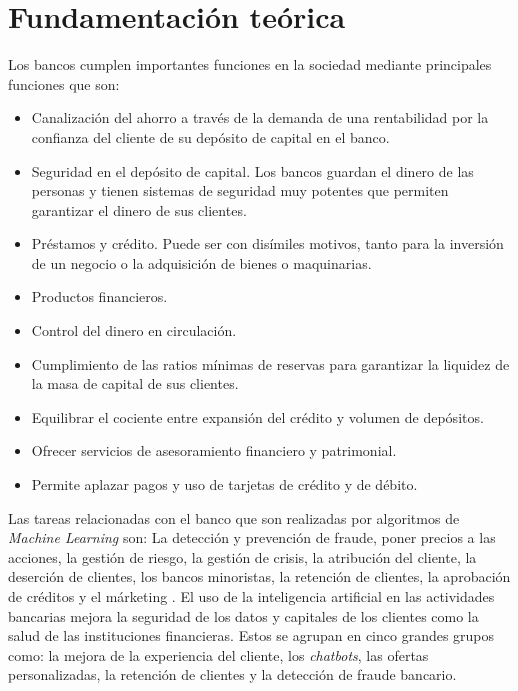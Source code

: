 \chapter{Fundamentaci\'{o}n te\'{o}rica}

  Los bancos cumplen importantes funciones en la sociedad mediante principales funciones que son\cite{1}:
  
  \begin{itemize}
  	\item Canalizaci\'{o}n del ahorro a trav\'{e}s de la demanda de una rentabilidad por la confianza del cliente de su dep\'{o}sito de capital en el banco.
  	\item Seguridad en el dep\'{o}sito de capital. Los bancos guardan el dinero de las personas y tienen sistemas de seguridad muy potentes que permiten garantizar el dinero de sus clientes.
  	\item Pr\'{e}stamos y cr\'{e}dito. Puede ser con dis\'{i}miles motivos, tanto para la inversi\'{o}n de un negocio o la adquisici\'{o}n de bienes o maquinarias.
  	\item Productos financieros.
  	\item Control del dinero en circulaci\'{o}n.
  	\item Cumplimiento de las ratios m\'{i}nimas de reservas para garantizar la liquidez de la masa de capital de sus clientes.
  	\item Equilibrar el cociente entre expansi\'{o}n del cr\'{e}dito y volumen de dep\'{o}sitos.
  	\item Ofrecer servicios de asesoramiento financiero y patrimonial.
  	\item Permite aplazar pagos y uso de tarjetas de cr\'{e}dito y de d\'{e}bito.
  \end{itemize}

  Las tareas relacionadas con el banco que son realizadas por algoritmos de \textit{Machine Learning} son: La detecci\'{o}n y prevenci\'{o}n de fraude, poner precios a las acciones, la gesti\'{o}n de riesgo, la gesti\'{o}n de crisis, la atribuci\'{o}n del cliente, la deserci\'{o}n de clientes, los bancos minoristas, la retenci\'{o}n de clientes, la aprobaci\'{o}n de cr\'{e}ditos y el m\'{a}rketing . El uso de la inteligencia artificial en las actividades bancarias mejora la seguridad de los datos y capitales de los clientes como la salud de las instituciones financieras. Estos se agrupan en cinco grandes grupos como: la mejora de la experiencia del cliente, los \textit{chatbots}, las ofertas personalizadas, la retenci\'{o}n de clientes y la detecci\'{o}n de fraude bancario.
  
